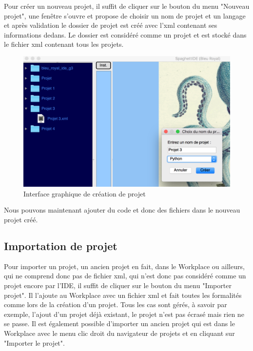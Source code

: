 \documentclass[a4paper,12pt]{article}
\begin{document}
Pour créer un nouveau projet, il suffit de cliquer sur le bouton du menu "Nouveau projet", une fenêtre s'ouvre et propose de choisir un nom de projet et un langage et après validation le dossier de projet est créé avec l'xml contenant ses informations dedans. Le dossier est considéré comme un projet et est stocké dans le fichier xml contenant tous les projets.

\begin{figure}[h!]
			\begin{center}
				\includegraphics[scale=0.4]{images/imgs_projet/creation_project.png}
				\caption{Interface graphique de création de projet}
			\end{center}
		\end{figure}

Nous pouvons maintenant ajouter du code et donc des fichiers dans le nouveau projet créé.

\subsection{Importation de projet}

Pour importer un projet, un ancien projet en fait, dans le Workplace ou ailleurs, qui ne comprend donc pas de fichier xml, qui n'est donc pas considéré comme un projet encore par l'IDE, il suffit de cliquer sur le bouton du menu "Importer projet". Il l'ajoute au Workplace avec un fichier xml et fait toutes les formalités comme lors de la création d'un projet. Tous les cas sont gérés, à savoir par exemple, l'ajout d'un projet déjà existant, le projet n'est pas écrasé mais rien ne se passe. Il est également possible d'importer un ancien projet qui est dans le Workplace avec le menu clic droit du navigateur de projets et en cliquant sur "Importer le projet".
\end{document}
